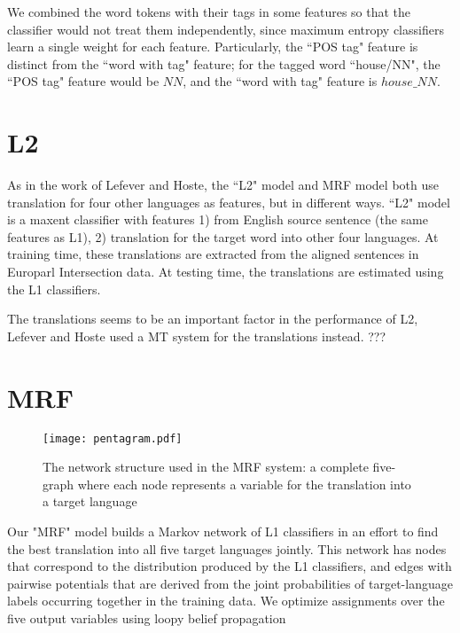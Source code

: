\documentclass[11pt,letterpaper]{article}
\begin{document}
We combined the word tokens with their tags in some features so that the
classifier would not treat them independently, since maximum entropy
classifiers learn a single weight for each feature.
Particularly, the ``POS tag" feature is distinct from the ``word with tag"
feature; for the tagged word ``house/NN", the ``POS tag" feature would be $NN$, and
the ``word with tag" feature is $house\_NN$. 


\section{L2}
As in the work of Lefever and Hoste, the ``L2" model and MRF model both use
translation for four other languages as features, but in different ways.  ``L2"
model is a maxent classifier with features 1) from English source sentence (the
same features as L1), 2) translation for the target word into other four
languages.  At training time, these translations are extracted from the aligned
sentences in Europarl Intersection data.  At testing time, the translations are
estimated using the L1 classifiers. 

The translations seems to be an important factor in the performance of L2,
Lefever and Hoste used a MT system for the translations instead.
???


\section{MRF}
\begin{figure}
  \begin{center}
  \texttt{[image: pentagram.pdf]}
  \end{center}
  \label{pentagram}
  \caption{The network structure used in the MRF system: a complete five-graph
  where each node represents a variable for the translation into a target
language}
\end{figure}
Our "MRF" model builds a Markov network of L1 classifiers in an effort to find
the best translation into all five target languages jointly. This network has
nodes that correspond to the distribution produced by the L1 classifiers, and
edges with pairwise potentials that are derived from the joint probabilities of
target-language labels occurring together in the training data. We optimize
assignments over the five output variables using loopy belief propagation
\end{document}
